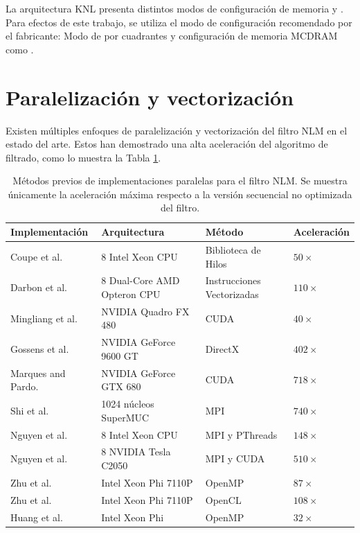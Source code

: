 La arquitectura KNL presenta distintos modos de configuración de memoria y . Para efectos de este trabajo, se utiliza el modo de configuración recomendado por el fabricante: Modo de  por cuadrantes y configuración de memoria MCDRAM como .


\section{Paralelización y vectorización}
\label{ch:marco_parallel}

Existen múltiples enfoques de paralelización y vectorización del filtro NLM en el estado del arte. Estos han demostrado una alta aceleración del algoritmo de filtrado, como lo muestra la Tabla \ref{method_table}. 


\begin{table}
\caption[Estado del arte en paralelizaciones del filtro NLM]{Métodos previos de implementaciones paralelas para el filtro NLM. Se muestra únicamente la aceleración máxima respecto a la versión secuencial no optimizada del filtro.}
\begin{tabularx}{1\linewidth}{X X X X} 
\hline
Implementación & Arquitectura & Método & Aceleración \\ [0.5ex]
 \hline\hline
 Coupe et al. \cite{coupe2006fast} &  8 Intel Xeon CPU & Biblioteca de Hilos & $50\times$\\
 Darbon et al. \cite{Darbon2008} &  8 Dual-Core AMD Opteron CPU & Instrucciones Vectorizadas & $110\times$\\
 Mingliang et al. \cite{mingliang2016medical} &  NVIDIA Quadro FX 480 & CUDA & $40\times$\\
Gossens et al. \cite{goossens2010gpu} &  NVIDIA GeForce 9600 GT & DirectX & $402\times$\\
Marques and Pardo. \cite{marques2013implementation} &  NVIDIA GeForce GTX 680 & CUDA & $718\times$\\ 
Shi et al. \cite{shi2015optimized} &   1024 núcleos SuperMUC & MPI & $740\times$\\
Nguyen et al. \cite{nguyen2016medical} &   8 Intel Xeon CPU & MPI y PThreads & $148\times$\\
Nguyen et al. \cite{nguyen2016medical} &   8 NVIDIA Tesla C2050 & MPI y CUDA & $510\times$\\
Zhu et al. \cite{zhu2016parallel} &  Intel Xeon Phi 7110P & OpenMP & $87\times$\\
Zhu et al. \cite{zhu2016parallel} &  Intel Xeon Phi 7110P & OpenCL & $108\times$\\
Huang et al. \cite{huang2017parallel} &  Intel Xeon Phi & OpenMP & $32\times$\\
\end{tabularx}
\label{method_table}
\end{table}

